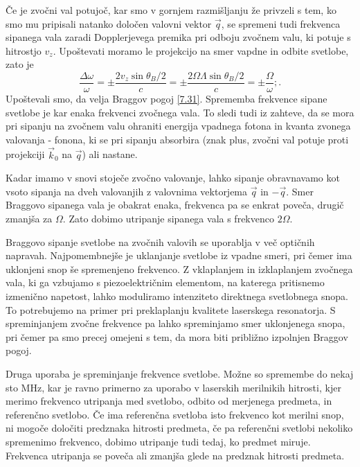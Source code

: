 Če je zvočni val potujoč, kar smo v gornjem razmišljanju že privzeli
s tem, ko smo mu pripisali natanko določen valovni vektor $\vec{q}$,
se spremeni tudi frekvenca sipanega vala zaradi Dopplerjevega premika
pri odboju zvočnem valu, ki potuje s hitrostjo $v_{z}$. Upoštevati
moramo le projekcijo na smer vapdne in odbite svetlobe, zato je 
\begin{equation}
\frac{\Delta\omega}{\omega}=\pm\frac{2v_{z}\sin\theta_{B}/2}{c}=\pm\frac{2\Omega\Lambda\sin\theta_{B}/2}{c}=\pm\frac{\Omega}{\omega};.\label{7.32}
\end{equation}
 Upoštevali smo, da velja Braggov pogoj \ref{7.31}. Sprememba frekvence
sipane svetlobe je kar enaka frekvenci zvočnega vala. To sledi tudi
iz zahteve, da se mora pri sipanju na zvočnem valu ohraniti energija
vpadnega fotona in kvanta zvo\textquotedbl{}nega valovanja - fonona,
ki se pri sipanju absorbira (znak plus, zvočni val potuje proti projekciji
$\vec{k}_{0}$ na $\vec{q}$) ali nastane.

Kadar imamo v snovi stoječe zvočno valovanje, lahko sipanje obravnavamo
kot vsoto sipanja na dveh valovanjih z valovnima vektorjema $\vec{q}$
in $-\vec{q}$. Smer Braggovo sipanega vala je obakrat enaka, frekvenca
pa se enkrat poveča, drugič zmanjša za $\Omega$. Zato dobimo utripanje
sipanega vala s frekvenco $2\Omega$.

Braggovo sipanje svetlobe na zvočnih valovih se uporablja v več optičnih
napravah. Najpomembnejše je uklanjanje svetlobe iz vpadne smeri, pri
čemer ima uklonjeni snop še spremenjeno frekvenco. Z vklaplanjem in
izklaplanjem zvočnega vala, ki ga vzbujamo s piezoelektričnim elementom,
na katerega pritisnemo izmenično napetost, lahko moduliramo intenziteto
direktnega svetlobnega snopa. To potrebujemo na primer pri preklaplanju
kvalitete laserskega resonatorja. S spreminjanjem zvočne frekvence
pa lahko spreminjamo smer uklonjenega snopa, pri čemer pa smo precej
omejeni s tem, da mora biti približno izpolnjen Braggov pogoj.

Druga uporaba je spreminjanje frekvence svetlobe. Možne so spremembe
do nekaj sto MHz, kar je ravno primerno za uporabo v laserskih merilnikih
hitrosti, kjer merimo frekvenco utripanja med svetlobo, odbito od
merjenega predmeta, in referenčno svetlobo. Če ima referenčna svetloba
isto frekvenco kot merilni snop, ni mogoče določiti predznaka hitrosti
predmeta, če pa referenčni svetlobi nekoliko spremenimo frekvenco,
dobimo utripanje tudi tedaj, ko predmet miruje. Frekvenca utripanja
se poveča ali zmanjša glede na predznak hitrosti predmeta.

